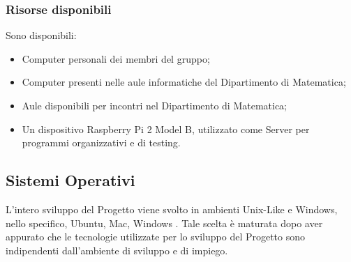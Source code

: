{\subsubsection{Risorse disponibili}{
	Sono disponibili:
	\begin{itemize}
		\item Computer personali dei membri del gruppo;
		\item Computer presenti nelle aule informatiche del Dipartimento di Matematica;
		\item Aule disponibili per incontri nel Dipartimento di Matematica;
		\item Un dispositivo Raspberry Pi 2 Model B, utilizzato come Server per programmi organizzativi e di testing.
	\end{itemize}
}
}

\subsection{Sistemi Operativi}

L’intero sviluppo del Progetto viene svolto in ambienti Unix-Like e Windows, nello specifico, Ubuntu, Mac, Windows . Tale scelta è maturata dopo aver appurato che le tecnologie utilizzate per lo sviluppo del Progetto sono indipendenti dall’ambiente di sviluppo e di impiego.

